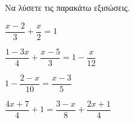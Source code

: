 Να λύσετε τις παρακάτω εξισώσεις.
\begin{multicols}{2}
\begin{alist}
\item $ \dfrac{x-2}{3}+\dfrac{x}{2}=1 $
\item $ \dfrac{1-3x}{4}+\dfrac{x-5}{3}=1-\dfrac{x}{12} $
\item $ 1-\dfrac{2-x}{10}=\dfrac{x-3}{5} $
\item $ \dfrac{4x+7}{4}+1=\dfrac{3-x}{8}+\dfrac{2x+1}{4} $
\end{alist}
\end{multicols}
